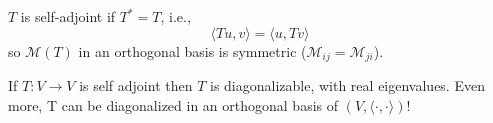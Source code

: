 \documentclass[12pt,oneside]{report}
\begin{document}




\begin{definition}
  \( T \) is self-adjoint if \( T^* = T \), i.e., 
  \begin{displaymath}
    \langle T u , v \rangle = \langle u,Tv \rangle 
  \end{displaymath}
  so \( \mathcal{M}(T) \) in an orthogonal basis is symmetric (\( \mathcal{M}_{ij}=\mathcal{M}_{ji} \)). 
\end{definition}



\begin{theorem}  
  If \( T : V \to  V  \) is self adjoint then \( T \) is diagonalizable, with real eigenvalues. Even more, T can be diagonalized in an orthogonal basis of \( ( V, \langle \cdot , \cdot  \rangle ) \)!  

\end{theorem}
\end{document}

